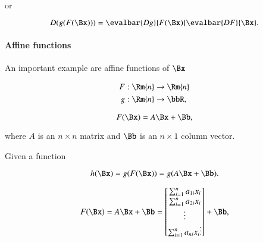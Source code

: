 or

\begin{dmath}\label{eqn:jacobianAndHessian:665}
D (g(F(\Bx)))
=
\evalbar{D g}{F(\Bx)}
\evalbar{D F}{\Bx}.
\end{dmath}

\paragraph{Affine functions}

An important example are affine functions of \( \Bx \)

\begin{dmath}\label{eqn:jacobianAndHessian:744}
\begin{aligned}
F &: \Rm{n} \rightarrow \Rm{n} \\
g &: \Rm{n} \rightarrow \bbR,
\end{aligned}
\end{dmath}

\begin{dmath}\label{eqn:jacobianAndHessian:764}
F(\Bx) = A \Bx + \Bb,
\end{dmath}

where \( A \) is an \( n \times n \) matrix and \( \Bb \) is an \( n \times 1 \) column vector.

Given a function

\begin{equation}\label{eqn:jacobianAndHessian:784}
h(\Bx) = g(F(\Bx)) = g(A \Bx + \Bb).
\end{equation}

\begin{dmath}\label{eqn:jacobianAndHessian:804}
F(\Bx)
= A \Bx + \Bb
=
\begin{bmatrix}
\sum_{i = 1}^n a_{1i} x_i \\
\sum_{i = 1}^n a_{2i} x_i \\
\vdots \\
\sum_{i = 1}^n a_{ni} x_i
\vdots \\
\end{bmatrix}
+
\Bb
,
\end{dmath}

